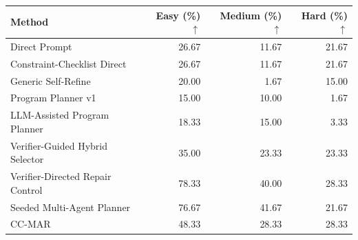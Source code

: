 \begin{tabular}{@{}lrrr@{}}
\toprule
Method & Easy (\%) $\uparrow$ & Medium (\%) $\uparrow$ & Hard (\%) $\uparrow$ \\
\midrule
Direct Prompt & 26.67 & 11.67 & 21.67 \\
Constraint-Checklist Direct & 26.67 & 11.67 & 21.67 \\
Generic Self-Refine & 20.00 & 1.67 & 15.00 \\
Program Planner v1 & 15.00 & 10.00 & 1.67 \\
LLM-Assisted Program Planner & 18.33 & 15.00 & 3.33 \\
Verifier-Guided Hybrid Selector & 35.00 & 23.33 & 23.33 \\
Verifier-Directed Repair Control & 78.33 & 40.00 & 28.33 \\
Seeded Multi-Agent Planner & 76.67 & 41.67 & 21.67 \\
CC-MAR & 48.33 & 28.33 & 28.33 \\
\bottomrule
\end{tabular}
